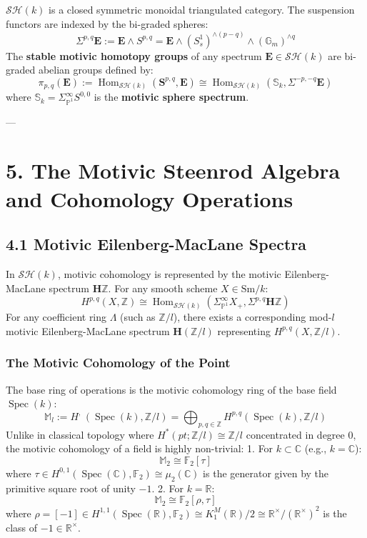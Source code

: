 \documentclass[11pt,twoside,openright]{amsbook}
\begin{document}
{$\mathcal{SH}(k)$ is a closed symmetric monoidal triangulated category. The suspension functors are indexed by the bi-graded spheres:
$$\Sigma^{p, q} \mathbf{E} := \mathbf{E} \wedge S^{p, q} = \mathbf{E} \wedge (S^1_s)^{\wedge(p - q)} \wedge (\mathbb{G}_m)^{\wedge q}$$
The \textbf{stable motivic homotopy groups} of any spectrum $\mathbf{E} \in \mathcal{SH}(k)$ are bi-graded abelian groups defined by:
$$\pi_{p, q}(\mathbf{E}) := \operatorname{Hom}_{\mathcal{SH}(k)}\left( \mathbf{S}^{p, q}, \mathbf{E} \right) \cong \operatorname{Hom}_{\mathcal{SH}(k)}\left( \mathbb{S}_k, \Sigma^{-p, -q} \mathbf{E} \right)$$
where $\mathbb{S}_k = \Sigma^{\infty}_{\mathbb{P}^1} S^{0, 0}$ is the \textbf{motivic sphere spectrum}.

---

\section{5. The Motivic Steenrod Algebra and Cohomology Operations}

\subsection{4.1 Motivic Eilenberg-MacLane Spectra}
In $\mathcal{SH}(k)$, motivic cohomology is represented by the motivic Eilenberg-MacLane spectrum $\mathbf{H}\mathbb{Z}$. For any smooth scheme $X \in \mathrm{Sm}/k$:
$$H^{p, q}(X, \mathbb{Z}) \cong \operatorname{Hom}_{\mathcal{SH}(k)}\left( \Sigma^{\infty}_{\mathbb{P}^1} X_+, \Sigma^{p, q} \mathbf{H}\mathbb{Z} \right)$$
For any coefficient ring $\Lambda$ (such as $\mathbb{Z}/l$), there exists a corresponding mod-$l$ motivic Eilenberg-MacLane spectrum $\mathbf{H}(\mathbb{Z}/l)$ representing $H^{p, q}(X, \mathbb{Z}/l)$.

\subsubsection{The Motivic Cohomology of the Point}
The base ring of operations is the motivic cohomology ring of the base field $\operatorname{Spec}(k)$:
$$\mathbb{M}_l := H^{\textit{, }}(\operatorname{Spec}(k), \mathbb{Z}/l) = \bigoplus_{p, q \in \mathbb{Z}} H^{p, q}(\operatorname{Spec}(k), \mathbb{Z}/l)$$
Unlike in classical topology where $H^*(pt; \mathbb{Z}/l) \cong \mathbb{Z}/l$ concentrated in degree 0, the motivic cohomology of a field is highly non-trivial:
1. For $k \subset \mathbb{C}$ (e.g., $k = \mathbb{C}$):
$$\mathbb{M}_2 \cong \mathbb{F}_2[\tau]$$
where $\tau \in H^{0, 1}(\operatorname{Spec}(\mathbb{C}), \mathbb{F}_2) \cong \mu_2(\mathbb{C})$ is the generator given by the primitive square root of unity $-1$.
2. For $k = \mathbb{R}$:
$$\mathbb{M}_2 \cong \mathbb{F}_2[\rho, \tau]$$
where $\rho = [-1] \in H^{1, 1}(\operatorname{Spec}(\mathbb{R}), \mathbb{F}_2) \cong K_1^M(\mathbb{R})/2 \cong \mathbb{R}^\times / (\mathbb{R}^\times)^2$ is the class of $-1 \in \mathbb{R}^\times$.

}
\end{document}
